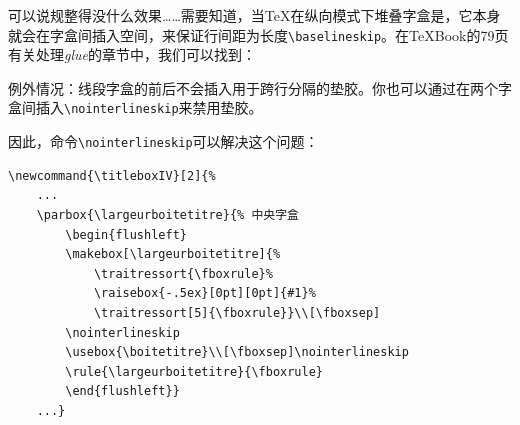 可以说规整得没什么效果……需要知道，当\TeX 在纵向模式下堆叠字盒是，它本身就会在字盒间插入空间，来保证行间距为长度\verb|\baselineskip|。在\TeX Book的79页有关处理\emph{glue}的章节中，我们可以找到：

\begin{origincitation}
    例外情况：线段字盒的前后不会插入用于跨行分隔的垫胶。你也可以通过在两个字盒间插入\verb|\nointerlineskip|来禁用垫胶。
\end{origincitation}

因此，命令\verb|\nointerlineskip|可以解决这个问题：

\begin{dmd}
\begin{verbatim}
\newcommand{\titleboxIV}[2]{%
    ...
    \parbox{\largeurboitetitre}{% 中央字盒
        \begin{flushleft}
        \makebox[\largeurboitetitre]{%
            \traitressort{\fboxrule}%
            \raisebox{-.5ex}[0pt][0pt]{#1}%
            \traitressort[5]{\fboxrule}}\\[\fboxsep]
        \nointerlineskip
        \usebox{\boitetitre}\\[\fboxsep]\nointerlineskip
        \rule{\largeurboitetitre}{\fboxrule}
        \end{flushleft}}  
    ...}\end{verbatim}
\end{dmd}

\newcommand{\titleboxIV}[2]{%
  \begin{lrbox}{\boitetitre}%
    \kern\fboxsep#2\kern\fboxsep
  \end{lrbox}
  \settowidth{\largeurboitetitre}{\usebox{\boitetitre}}%
  \settoheight{\hauteurboitetitre}{\usebox{\boitetitre}}%
  \settodepth{\tempdim}{\usebox{\boitetitre}}%
  \addtolength{\hauteurboitetitre}{\tempdim+2\fboxrule+2\fboxsep}%
  \parbox{\fboxrule}{%
    \rule{\fboxrule}{\hauteurboitetitre}}%
  \parbox{\largeurboitetitre}{%
    \begin{flushleft}
      \makebox[\largeurboitetitre]{%
        \traitressort{\fboxrule}%
        \raisebox{-.5ex}[0pt][0pt]{#1}%
        \traitressort[5]{\fboxrule}}\\[\fboxsep]\nointerlineskip
      \usebox{\boitetitre}\\[\fboxsep]\nointerlineskip
      \rule{\largeurboitetitre}{\fboxrule}
    \end{flushleft}}%
  \parbox{\fboxrule}{%
    \rule{\fboxrule}{\hauteurboitetitre}}}
\enlargethispage{2cm}

